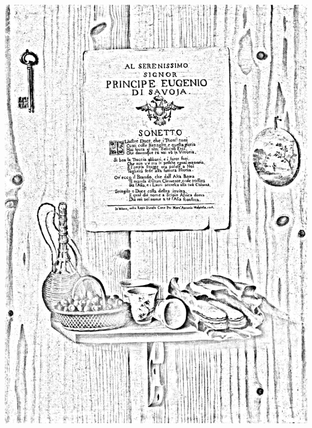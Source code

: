 \documentclass[hidelinks,12pt,a4paper]{article}
\begin{document}
\begin{adjustwidth}{-30mm}{-30mm}
			\thispagestyle{empty}
			\begin{minipage}{0.91\linewidth}
				\centering
				\includegraphics[scale=0.2]{Gianlisi_Antonio_Junior-Trompe_l_oeil_con_sonetto_in_onore_di_Eugenio_di_Savoia_e_mensola_con_oggetti.jpg}
			\end{minipage}
			
			\vspace*{\fill}
			\newpage
			

\end{adjustwidth}
\end{document}
